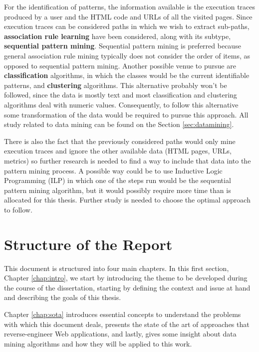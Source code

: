 For the identification of patterns, the information available is the execution traces produced by a user and the HTML code and URLs of all the visited pages. Since execution traces can be considered paths in which we wish to extract sub-paths, \textbf{association rule learning} have been considered, along with its subtype, \textbf{sequential pattern mining}. Sequential pattern mining is preferred because general association rule mining typically does not consider the order of items, as opposed to sequential pattern mining. Another possible venue to pursue are \textbf{classification} algorithms, in which the classes would be the current identifiable patterns, and \textbf{clustering} algorithms. This alternative probably won't be followed, since the data is mostly text and most classification and clustering algorithms deal with numeric values. Consequently, to follow this alternative some transformation of the data would be required to pursue this approach. All study related to data mining can be found on the Section \ref{sec:datamining}. 

There is also the fact that the previously considered paths would only mine execution traces and ignore the other available data (HTML pages, URLs, metrics) so further research is needed to find a way to include that data into the pattern mining process. A possible way could be to use Inductive Logic Programming (ILP) in which one of the steps run would be the sequential pattern mining algorithm, but it would possibly require more time than is allocated for this thesis. Further study is needed to choose the optimal approach to follow.

\section{Structure of the Report} \label{sec:outline}

This document is structured into four main chapters. In this first section, Chapter \ref{chap:intro}, we start by introducing the theme to be developed during the course of the dissertation, starting by defining the context and issue at hand and describing the goals of this thesis.

Chapter \ref{chap:sota} introduces essential concepts to understand the problems with which this document deals, presents the state of the art of approaches that reverse-engineer Web applications, and lastly, gives some insight about data mining algorithms and how they will be applied to this work.



